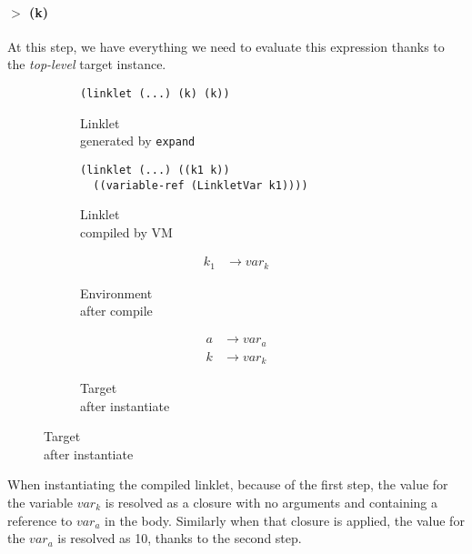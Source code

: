 \paragraph{$>$ (k)}

At this step, we have everything we need to evaluate this expression
thanks to the \emph{top-level} target instance.

\vspace{-0.3cm}

\begin{figure}[h!]
  \footnotesize
  \begin{subfigure}[b]{0.25\textwidth}
    \begin{mdframed}
\begin{verbatim}
(linklet (...) (k) (k))
\end{verbatim}
    \end{mdframed}
    \caption{Linklet \\ generated by \texttt{expand}}
    \label{fig:1}
  \end{subfigure}
  \begin{subfigure}[b]{0.38\textwidth}
    \begin{mdframed}
\begin{verbatim}
(linklet (...) ((k1 k))
  ((variable-ref (LinkletVar k1))))
\end{verbatim}
    \end{mdframed}
    \caption{Linklet \\ compiled by VM}
    \label{fig:2}
  \end{subfigure} \hfill
  \begin{subfigure}[b]{0.15\textwidth}
    \begin{mdframed}
      \begin{align*}
        k_1 &\rightarrow var_k
      \end{align*}
    \end{mdframed}
    \caption{Environment \\ after compile}
    \label{fig:2}
  \end{subfigure}
  \begin{subfigure}[b]{0.15\textwidth}
    \begin{mdframed}
      \begin{align*}
        a &\rightarrow var_a \\
        k &\rightarrow var_k
      \end{align*}
    \end{mdframed}
    \caption{Target \\ after instantiate}
    \label{fig:2}
  \end{subfigure}
\end{figure}

When instantiating the compiled linklet, because of the first step,
the value for the variable $var_k$ is resolved as a closure with no
arguments and containing a reference to $var_a$ in the body. Similarly
when that closure is applied, the value for the $var_a$ is resolved as
10, thanks to the second step.
